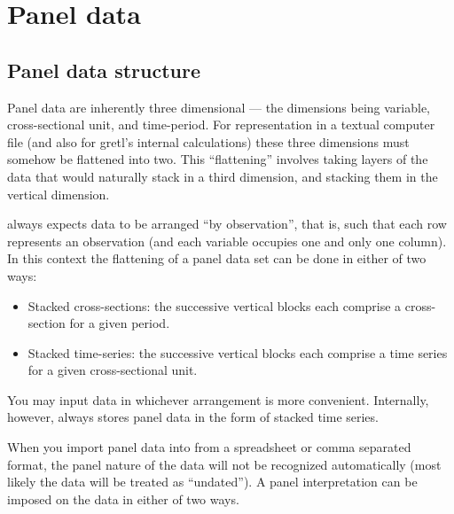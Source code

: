 \chapter{Panel data}
\label{chap-panel}

\section{Panel data structure}
\label{panel-structure}

Panel data are inherently three dimensional --- the dimensions being
variable, cross-sectional unit, and time-period.  For representation
in a textual computer file (and also for gretl's internal
calculations) these three dimensions must somehow be flattened into
two.  This ``flattening'' involves taking layers of the data that
would naturally stack in a third dimension, and stacking them in the
vertical dimension.

 always expects data to be arranged ``by observation'',
that is, such that each row represents an observation (and each
variable occupies one and only one column).  In this context the
flattening of a panel data set can be done in either of two ways:

\begin{itemize}
\item Stacked cross-sections: the successive vertical blocks each
  comprise a cross-section for a given period.
\item Stacked time-series: the successive vertical blocks each
  comprise a time series for a given cross-sectional unit.
\end{itemize}

You may input data in whichever arrangement is more convenient.
Internally, however,  always stores panel data in
the form of stacked time series.

When you import panel data into  from a spreadsheet or
comma separated format, the panel nature of the data will not be
recognized automatically (most likely the data will be treated as
``undated'').  A panel interpretation can be imposed on the data in
either of two ways.

